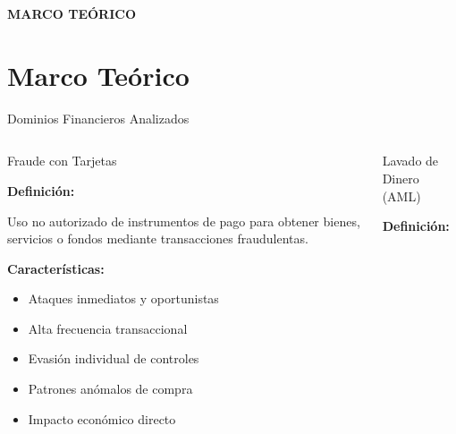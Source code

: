 \documentclass[aspectratio=169, 8pt]{beamer}
\begin{document}
\begin{frame}
\vfill
\centering
{\fontsize{28}{34}\selectfont\bfseries MARCO TEÓRICO}
\vfill
\end{frame}
\section{Marco Teórico}

\begin{frame}{Dominios Financieros Analizados}

\begin{columns}

\begin{block}{Fraude con Tarjetas}

\vspace{0.1cm}

\textbf{Definición:}

\vspace{0.05cm}

Uso no autorizado de instrumentos de pago para obtener bienes, servicios o fondos mediante transacciones fraudulentas.

\vspace{0.2cm}

\textbf{Características:}

\begin{itemize}
    \item Ataques inmediatos y oportunistas
    \item Alta frecuencia transaccional
    \item Evasión individual de controles
    \item Patrones anómalos de compra
    \item Impacto económico directo
\end{itemize}
\end{block}


\begin{block}{Lavado de Dinero (AML)}

\vspace{0.1cm}

\textbf{Definición:}

\vspace{0.05cm}


\end{block}
\end{columns}
\end{frame}
\end{document}
